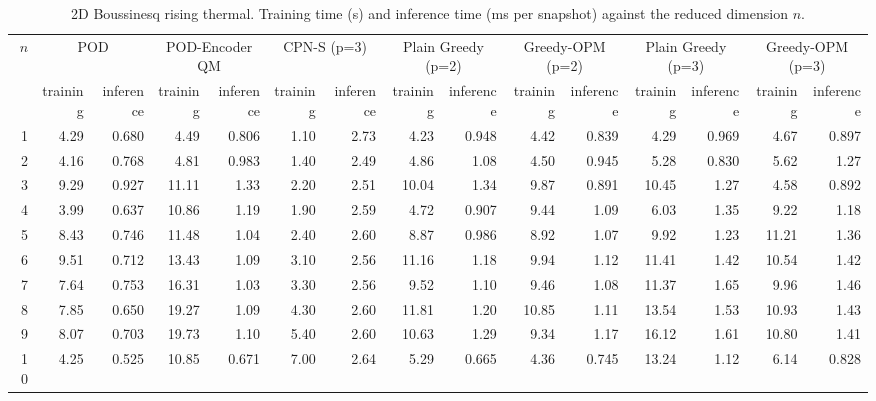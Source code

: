 \begin{table}[tb]
  \centering
  \caption{2D Boussinesq rising thermal. Training time (s) and inference time (ms per snapshot) against the reduced dimension \( n \).}
  \label{tab:boussinesq_timings}
  \small
  \setlength{\tabcolsep}{4pt}
  \begin{tabular}{rrrrrrrrrrrrrrr}
    \toprule
    \multirow{2}{*}{\( n \)} & \multicolumn{2}{c}{POD} & \multicolumn{2}{c}{POD-Encoder QM} & \multicolumn{2}{c}{CPN-S (p=3)} & \multicolumn{2}{c}{Plain Greedy (p=2)} & \multicolumn{2}{c}{Greedy-OPM (p=2)} & \multicolumn{2}{c}{Plain Greedy (p=3)} & \multicolumn{2}{c}{Greedy-OPM (p=3)} \\
    \cmidrule(lr){2-3} \cmidrule(lr){4-5} \cmidrule(lr){6-7} \cmidrule(lr){8-9} \cmidrule(lr){10-11} \cmidrule(lr){12-13} \cmidrule(lr){14-15}
     & training & inference & training & inference & training & inference & training & inference & training & inference & training & inference & training & inference \\
    \midrule
    1 & 4.29 & 0.680 & 4.49 & 0.806 & 1.10 & 2.73 & 4.23 & 0.948 & 4.42 & 0.839 & 4.29 & 0.969 & 4.67 & 0.897 \\
    2 & 4.16 & 0.768 & 4.81 & 0.983 & 1.40 & 2.49 & 4.86 & 1.08 & 4.50 & 0.945 & 5.28 & 0.830 & 5.62 & 1.27 \\
    3 & 9.29 & 0.927 & 11.11 & 1.33 & 2.20 & 2.51 & 10.04 & 1.34 & 9.87 & 0.891 & 10.45 & 1.27 & 4.58 & 0.892 \\
    4 & 3.99 & 0.637 & 10.86 & 1.19 & 1.90 & 2.59 & 4.72 & 0.907 & 9.44 & 1.09 & 6.03 & 1.35 & 9.22 & 1.18 \\
    5 & 8.43 & 0.746 & 11.48 & 1.04 & 2.40 & 2.60 & 8.87 & 0.986 & 8.92 & 1.07 & 9.92 & 1.23 & 11.21 & 1.36 \\
    6 & 9.51 & 0.712 & 13.43 & 1.09 & 3.10 & 2.56 & 11.16 & 1.18 & 9.94 & 1.12 & 11.41 & 1.42 & 10.54 & 1.42 \\
    7 & 7.64 & 0.753 & 16.31 & 1.03 & 3.30 & 2.56 & 9.52 & 1.10 & 9.46 & 1.08 & 11.37 & 1.65 & 9.96 & 1.46 \\
    8 & 7.85 & 0.650 & 19.27 & 1.09 & 4.30 & 2.60 & 11.81 & 1.20 & 10.85 & 1.11 & 13.54 & 1.53 & 10.93 & 1.43 \\
    9 & 8.07 & 0.703 & 19.73 & 1.10 & 5.40 & 2.60 & 10.63 & 1.29 & 9.34 & 1.17 & 16.12 & 1.61 & 10.80 & 1.41 \\
    10 & 4.25 & 0.525 & 10.85 & 0.671 & 7.00 & 2.64 & 5.29 & 0.665 & 4.36 & 0.745 & 13.24 & 1.12 & 6.14 & 0.828 \\
    \bottomrule
  \end{tabular}
\end{table}
